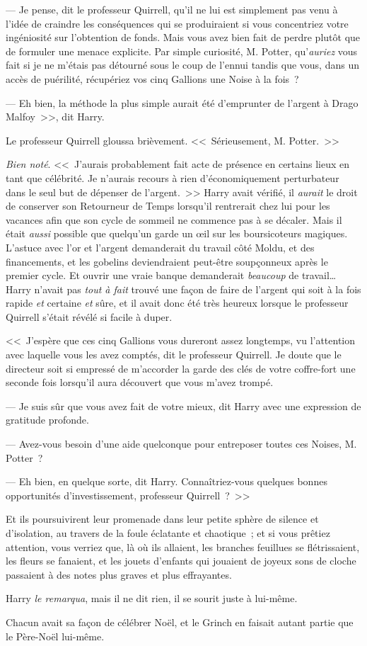 --- Je pense, dit le professeur Quirrell, qu'il ne lui est simplement pas venu à l'idée de craindre les conséquences qui se produiraient si vous concentriez votre ingéniosité sur l'obtention de fonds. Mais vous avez bien fait de perdre plutôt que de formuler une menace explicite. Par simple curiosité, M. Potter, qu'\emph{auriez} vous fait si je ne m'étais pas détourné sous le coup de l'ennui tandis que vous, dans un accès de puérilité, récupériez vos cinq Gallions une Noise à la fois~?

--- Eh bien, la méthode la plus simple aurait été d'emprunter de l'argent à Drago Malfoy~>>, dit Harry.

Le professeur Quirrell gloussa brièvement. <<~Sérieusement, M. Potter.~>>

\emph{Bien noté}. <<~J'aurais probablement fait acte de présence en certains lieux en tant que célébrité. Je n'aurais recours à rien d'économiquement perturbateur dans le seul but de dépenser de l'argent.~>> Harry avait vérifié, il \emph{aurait} le droit de conserver son Retourneur de Temps lorsqu'il rentrerait chez lui pour les vacances afin que son cycle de sommeil ne commence pas à se décaler. Mais il était \emph{aussi} possible que quelqu'un garde un œil sur les boursicoteurs magiques. L'astuce avec l'or et l'argent demanderait du travail côté Moldu, et des financements, et les gobelins deviendraient peut-être soupçonneux après le premier cycle. Et ouvrir une vraie banque demanderait \emph{beaucoup} de travail… Harry n'avait pas \emph{tout à fait} trouvé une façon de faire de l'argent qui soit à la fois rapide \emph{et} certaine \emph{et} sûre, et il avait donc été très heureux lorsque le professeur Quirrell s'était révélé si facile à duper.

<<~J'espère que ces cinq Gallions vous dureront assez longtemps, vu l'attention avec laquelle vous les avez comptés, dit le professeur Quirrell. Je doute que le directeur soit si empressé de m'accorder la garde des clés de votre coffre-fort une seconde fois lorsqu'il aura découvert que vous m'avez trompé.

--- Je suis sûr que vous avez fait de votre mieux, dit Harry avec une expression de gratitude profonde.

--- Avez-vous besoin d'une aide quelconque pour entreposer toutes ces Noises, M. Potter~?

--- Eh bien, en quelque sorte, dit Harry. Connaîtriez-vous quelques bonnes opportunités d'investissement, professeur Quirrell~?~>>

Et ils poursuivirent leur promenade dans leur petite sphère de silence et d'isolation, au travers de la foule éclatante et chaotique~; et si vous prêtiez attention, vous verriez que, là où ils allaient, les branches feuillues se flétrissaient, les fleurs se fanaient, et les jouets d'enfants qui jouaient de joyeux sons de cloche passaient à des notes plus graves et plus effrayantes.

Harry \emph{le remarqua}, mais il ne dit rien, il se sourit juste à lui-même.

Chacun avait sa façon de célébrer Noël, et le Grinch en faisait autant partie que le Père-Noël lui-même.
